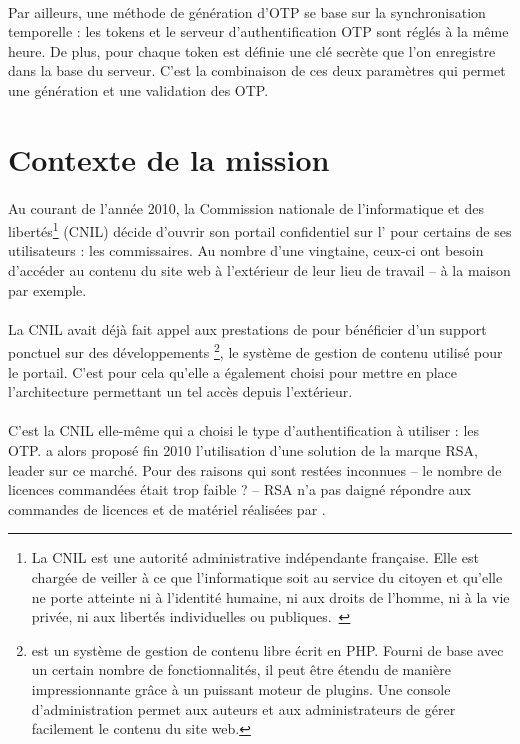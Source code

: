 \paragraph{}
Par ailleurs, une méthode de génération d'OTP se base sur la synchronisation temporelle : les tokens et le serveur d'authentification OTP sont réglés à la même heure.
De plus, pour chaque token est définie une clé secrète que l'on enregistre dans la base du serveur.
C'est la combinaison de ces deux paramètres qui permet une génération et une validation des OTP.


\section{Contexte de la mission}

\paragraph{}
Au courant de l'année 2010, la Commission nationale de l'informatique et des libertés\footnote{La CNIL est une autorité administrative indépendante française. Elle est chargée de veiller à ce que l'informatique soit au service du citoyen et qu'elle ne porte atteinte ni à l'identité humaine, ni aux droits de l'homme, ni à la vie privée, ni aux libertés individuelles ou publiques.~\cite{cnil}} (CNIL) décide d'ouvrir son portail \aintranet{} confidentiel sur l'\ainternet{} pour certains de ses utilisateurs : les commissaires.
Au nombre d'une vingtaine, ceux-ci ont besoin d'accéder au contenu du site web à l'extérieur de leur lieu de travail -- à la maison par exemple.

\paragraph{}
La CNIL avait déjà fait appel aux prestations de \asmile{} pour bénéficier d'un support ponctuel sur des développements \atypo{}\footnote{\atypo{} est un système de gestion de contenu libre écrit en PHP. Fourni de base avec un certain nombre de fonctionnalités, il peut être étendu de manière impressionnante grâce à un puissant moteur de plugins. Une console d'administration permet aux auteurs et aux administrateurs de gérer facilement le contenu du site web.}, le système de gestion de contenu utilisé pour le portail.
C'est pour cela qu'elle a également choisi \asmile{} pour mettre en place l'architecture permettant un tel accès depuis l'extérieur.

\paragraph{}
C'est la CNIL elle-même qui a choisi le type d'authentification à utiliser : les OTP.
\asmile{} a alors proposé fin 2010 l'utilisation d'une solution de la marque RSA, leader sur ce marché.
Pour des raisons qui sont restées inconnues -- le nombre de licences commandées était trop faible ? -- RSA n'a pas daigné répondre aux commandes de licences et de matériel réalisées par \asmile.

